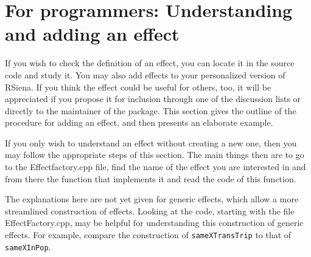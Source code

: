\documentclass[a4paper,fleqn,11pt]{article}
\newcommand{\+}{\, + \,}
\newcommand{\sfn}[1]{\textsf{#1}}
\newcommand{\rs}{{\sf RSiena}}
\begin{document}
\section{For programmers: Understanding and adding an effect}

If you wish to check the definition of an effect,
you can locate it in the source code and study it.
You may also add
effects to your personalized version of \rs.
If you think the effect could be useful for others, too,
it will be appreciated if you propose it for inclusion through
one of the discussion lists or directly to the maintainer
of the package.
This section gives the outline of the procedure for adding an effect, and then presents
an elaborate example.

If you only wish to understand an effect without creating
a new one, then you may
follow the appropriate steps of this section.
The main things then are to go to the \textsf{Effectfactory.cpp}
file, find the name of the effect you are interested in and
from there the function that implements it
and read the code of this function.

The explanations here are not yet given for generic effects, which allow
a more streamlined construction of effects. Looking at the code,
starting with the file \sfn{EffectFactory.cpp}, may be helpful for understanding
this construction of generic effects.
For example, compare the construction of \texttt{sameXTransTrip} to that of
\texttt{sameXInPop}.
\end{document}
